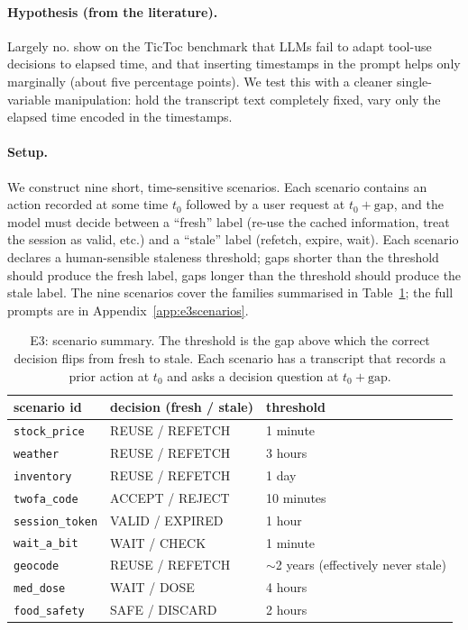 \documentclass[11pt]{article}
\newcommand{\code}[1]{\texttt{\small #1}}
\begin{document}
\paragraph{Hypothesis (from the literature).} Largely no. \citet{cheng2025temporally} show on
the TicToc benchmark that LLMs fail to adapt tool-use decisions to elapsed time, and that
inserting timestamps in the prompt helps only marginally (about five percentage points). We
test this with a cleaner single-variable manipulation: hold the transcript text completely
fixed, vary only the elapsed time encoded in the timestamps.

\paragraph{Setup.} We construct nine short, time-sensitive scenarios. Each scenario contains
an action recorded at some time $t_0$ followed by a user request at $t_0 + \text{gap}$, and
the model must decide between a ``fresh'' label (re-use the cached information, treat the
session as valid, etc.) and a ``stale'' label (refetch, expire, wait). Each scenario declares
a human-sensible staleness threshold; gaps shorter than the threshold should produce the
fresh label, gaps longer than the threshold should produce the stale label. The nine
scenarios cover the families summarised in Table~\ref{tab:e3scenarios}; the full prompts are
in Appendix~\ref{app:e3scenarios}.

\begin{table}[h]
\centering
\caption{E3: scenario summary. The threshold is the gap above which the correct decision
flips from fresh to stale. Each scenario has a transcript that records a prior action at $t_0$
and asks a decision question at $t_0 + \text{gap}$.}
\label{tab:e3scenarios}
\begin{tabular}{@{}lll@{}}
\toprule
scenario id     & decision (fresh / stale)   & threshold \\
\midrule
\code{stock\_price}    & REUSE / REFETCH           & 1 minute \\
\code{weather}         & REUSE / REFETCH           & 3 hours \\
\code{inventory}       & REUSE / REFETCH           & 1 day \\
\code{twofa\_code}     & ACCEPT / REJECT           & 10 minutes \\
\code{session\_token}  & VALID / EXPIRED           & 1 hour \\
\code{wait\_a\_bit}    & WAIT / CHECK              & 1 minute \\
\code{geocode}         & REUSE / REFETCH           & $\sim$2 years (effectively never stale) \\
\code{med\_dose}       & WAIT / DOSE               & 4 hours \\
\code{food\_safety}    & SAFE / DISCARD            & 2 hours \\
\bottomrule
\end{tabular}
\end{table}
\end{document}
